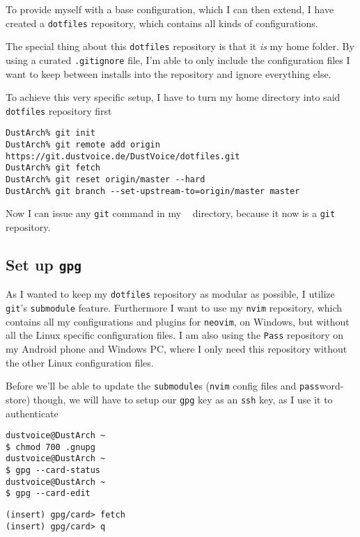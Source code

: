 \documentclass[10pt]{dustdoc}
\begin{document}
To provide myself with a base configuration, which I can then extend, I have created a \texttt{dotfiles} repository, which contains all kinds of configurations.

The special thing about this \texttt{dotfiles} repository is that it \emph{is} my home folder.
By using a curated \texttt{.gitignore} file, I’m able to only include the configuration files I want to keep between installs into the repository and ignore everything else.

To achieve this very specific setup, I have to turn my home directory into said \texttt{dotfiles} repository first

\begin{verbatim}
DustArch% git init
DustArch% git remote add origin https://git.dustvoice.de/DustVoice/dotfiles.git
DustArch% git fetch
DustArch% git reset origin/master --hard
DustArch% git branch --set-upstream-to=origin/master master
\end{verbatim}

Now I can issue any \texttt{git} command in my \texttt{~} directory, because it now is a \texttt{git} repository.

\subsection{Set up \texttt{gpg}}
\label{sec:set-up-gpg}

As I wanted to keep my \texttt{dotfiles} repository as modular as possible, I utilize \texttt{git}'s \texttt{submodule} feature.
Furthermore I want to use my \texttt{nvim} repository, which contains all my configurations and plugins for \texttt{neovim}, on Windows, but without all the Linux specific configuration files.
I am also using the \texttt{Pass} repository on my Android phone and Windows PC, where I only need this repository without the other Linux configuration files.

Before we’ll be able to update the \texttt{submodule}s (\texttt{nvim} config files and \texttt{pass}word-store) though, we will have to setup our \texttt{gpg} key as an \texttt{ssh} key, as I use it to authenticate

\begin{verbatim}
dustvoice@DustArch ~
$ chmod 700 .gnupg
dustvoice@DustArch ~
$ gpg --card-status
dustvoice@DustArch ~
$ gpg --card-edit
\end{verbatim}

\begin{verbatim}
(insert) gpg/card> fetch
(insert) gpg/card> q
\end{verbatim}
\end{document}
